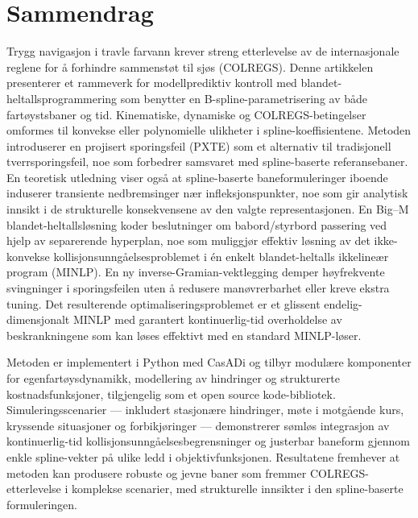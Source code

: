 \cleardoublepage

\section*{Sammendrag}
\vspace{0.5cm}

Trygg navigasjon i travle farvann krever streng etterlevelse av de internasjonale reglene for å forhindre sammenstøt til sjøs (COLREGS).
Denne artikkelen presenterer et rammeverk for modellprediktiv kontroll med blandet-heltallsprogrammering som benytter en B-spline-parametrisering av både fartøystsbaner og tid. Kinematiske, dynamiske og COLREGS-betingelser omformes til konvekse eller polynomielle ulikheter i spline-koeffisientene.
Metoden introduserer en projisert sporingsfeil (PXTE) som et alternativ til tradisjonell tverrsporingsfeil, noe som forbedrer samsvaret med spline-baserte referansebaner. En teoretisk utledning viser også at spline-baserte baneformuleringer iboende induserer transiente nedbremsinger nær infleksjonspunkter, noe som gir analytisk innsikt i de strukturelle konsekvensene av den valgte representasjonen.
En Big–M blandet-heltallsløsning koder beslutninger om babord/styrbord passering ved hjelp av separerende hyperplan, noe som muliggjør effektiv løsning av det ikke-konvekse kollisjonsunngåelsesproblemet i én enkelt blandet-heltalls ikkelineær program (MINLP).
En ny inverse-Gramian-vektlegging demper høyfrekvente svingninger i sporingsfeilen uten å redusere manøvrerbarhet eller kreve ekstra tuning. Det resulterende optimaliseringsproblemet er et glissent endelig-dimensjonalt MINLP med garantert kontinuerlig-tid overholdelse av beskrankningene som kan løses effektivt med en standard MINLP-løser.

Metoden er implementert i Python med CasADi og tilbyr modulære komponenter for egenfartøysdynamikk, modellering av hindringer og strukturerte kostnadsfunksjoner, tilgjengelig som et open source kode-bibliotek. Simuleringsscenarier — inkludert stasjonære hindringer, møte i motgående kurs, kryssende situasjoner og forbikjøringer — demonstrerer sømløs integrasjon av kontinuerlig-tid kollisjonsunngåelsesbegrensninger og justerbar baneform gjennom enkle spline-vekter på ulike ledd i objektivfunksjonen. Resultatene fremhever at metoden kan produsere robuste og jevne baner som fremmer COLREGS-etterlevelse i komplekse scenarier, med strukturelle innsikter i den spline-baserte formuleringen.

\cleardoublepage